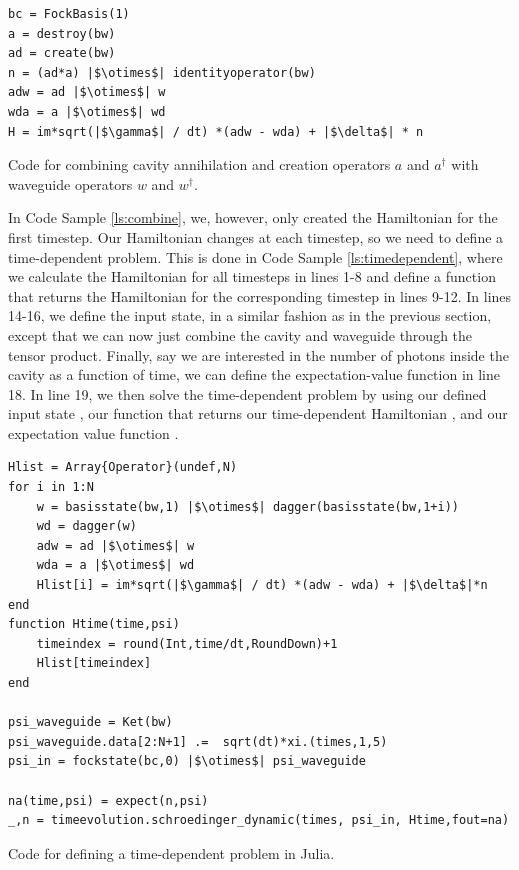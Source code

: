 \begin{listing}[H]
\begin{verbatim}
bc = FockBasis(1)
a = destroy(bw)
ad = create(bw)
n = (ad*a) |$\otimes$| identityoperator(bw)
adw = ad |$\otimes$| w
wda = a |$\otimes$| wd
H = im*sqrt(|$\gamma$| / dt) *(adw - wda) + |$\delta$| * n 
\end{verbatim}
\caption{Code for combining cavity annihilation and creation operators $a$ and $a^\dagger$ with waveguide operators $w$ and $w^\dagger$.}
\label{ls:combine}
\end{listing}

In Code Sample \ref{ls:combine}, we, however, only created the Hamiltonian for the first timestep. Our Hamiltonian changes at each timestep, so we need to define a time-dependent problem. This is done in Code Sample \ref{ls:timedependent}, where we calculate the Hamiltonian for all timesteps in lines 1-8 and define a function that returns the Hamiltonian for the corresponding timestep in lines 9-12. In lines 14-16, we define the input state, in a similar fashion as in the previous section, except that we can now just combine the cavity and waveguide through the tensor product. Finally, say we are interested in the number of photons inside the cavity as a function of time, we can define the expectation-value function  in line 18. In line 19, we then solve the time-dependent problem by using our defined input state , our function that returns our time-dependent Hamiltonian , and our expectation value function .

\begin{listing}[H]
\begin{verbatim}
Hlist = Array{Operator}(undef,N)
for i in 1:N
    w = basisstate(bw,1) |$\otimes$| dagger(basisstate(bw,1+i))
    wd = dagger(w)
    adw = ad |$\otimes$| w
    wda = a |$\otimes$| wd
    Hlist[i] = im*sqrt(|$\gamma$| / dt) *(adw - wda) + |$\delta$|*n
end
function Htime(time,psi)
    timeindex = round(Int,time/dt,RoundDown)+1
    Hlist[timeindex]   
end

psi_waveguide = Ket(bw)
psi_waveguide.data[2:N+1] .=  sqrt(dt)*xi.(times,1,5)
psi_in = fockstate(bc,0) |$\otimes$| psi_waveguide

na(time,psi) = expect(n,psi)
_,n = timeevolution.schroedinger_dynamic(times, psi_in, Htime,fout=na)
\end{verbatim}
\caption{Code for defining a time-dependent problem in Julia.}
\label{ls:timedependent}
\end{listing}

